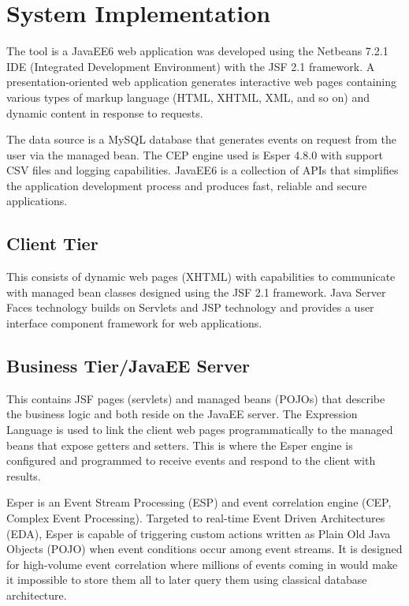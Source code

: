  
\section{System Implementation}

\noindent The tool is a JavaEE6 web application was developed using the Netbeans 7.2.1 IDE (Integrated Development Environment) with the JSF 2.1 framework. A presentation-oriented web application generates interactive web pages containing various types of markup language (HTML, XHTML, XML, and so on) and dynamic content in response to requests.

\noindent The data source is a MySQL database that generates events on request from the user via the managed bean. The CEP engine used is Esper 4.8.0 with support CSV files and logging capabilities. JavaEE6 is a collection of APIs that simplifies the application development process and produces fast, reliable and secure applications.

\subsection{Client Tier}

\noindent This consists of dynamic web pages (XHTML) with capabilities to communicate with managed bean classes designed using the JSF 2.1 framework. Java Server Faces technology builds on Servlets and JSP technology and provides a user interface component framework for web applications.

\subsection{Business Tier/JavaEE Server}

\noindent This contains JSF pages (servlets) and managed beans (POJOs) that describe the business logic and both reside on the JavaEE server. The Expression Language is used to link the client web pages programmatically to the managed beans that expose getters and setters. This is where the Esper engine is configured and programmed to receive events and respond to the client with results.

\noindent Esper is an Event Stream Processing (ESP) and event correlation engine (CEP, Complex Event Processing). Targeted to real-time Event Driven Architectures (EDA), Esper is capable of triggering custom actions written as Plain Old Java Objects (POJO) when event conditions occur among event streams. It is designed for high-volume event correlation where millions of events coming in would make it impossible to store them all to later query them using classical database architecture.

